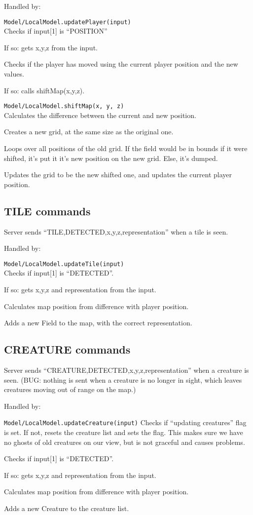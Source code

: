\documentclass{article}
\begin{document}
			Handled by:
			
			\texttt{Model/LocalModel.updatePlayer(input)}\\
				Checks if input[1] is ``POSITION''
			
				If so: gets x,y,z from the input.
				
				Checks if the player has moved using the current player position and the new values.
				
				If so: calls shiftMap(x,y,z).
				
			\texttt{Model/LocalModel.shiftMap(x, y, z)}\\
				Calculates the difference between the current and new position.
			
				Creates a new grid, at the same size as the original one.
				
				Loops over all positions of the old grid. If the field would be in bounds if it were shifted, it's put it it's new position on the new grid. Else, it's dumped.
				
				Updates the grid to be the new shifted one, and updates the current player position.
		\subsection{TILE commands}
			Server sends ``TILE,DETECTED,x,y,z,representation'' when a tile is seen.
			
			Handled by:
			
			\texttt{Model/LocalModel.updateTile(input)}\\
				Checks if input[1] is ``DETECTED''.
				
				If so: gets x,y,z and representation from the input.
				
				Calculates map position from difference with player position.
				
				Adds a new Field to the map, with the correct representation.
		\subsection{CREATURE commands}
			Server sends ``CREATURE,DETECTED,x,y,z,representation'' when a creature is seen.
			(BUG: nothing is sent when a creature is no longer in sight, which leaves creatures moving out of range on the map.)
			
			Handled by:
			
			\texttt{Model/LocalModel.updateCreature(input)}
				Checks if ``updating creatures'' flag is set. If not, resets the creature list and sets the flag. This makes sure we have no ghosts of old creatures on our view, but is not graceful and causes problems.
				
				Checks if input[1] is ``DETECTED''.
				
				If so: gets x,y,z and representation from the input.
				
				Calculates map position from difference with player position.
				
				Adds a new Creature to the creature list.
\end{document}
